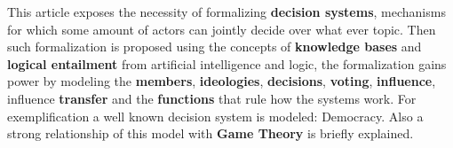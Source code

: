 
This article exposes the necessity of formalizing \textbf{decision systems}, mechanisms for which some amount of actors can jointly decide over what ever topic. Then such formalization is proposed using the concepts of \textbf{knowledge bases} and \textbf{logical entailment} from artificial intelligence and logic, the formalization gains power by modeling the \textbf{members}, \textbf{ideologies}, \textbf{decisions}, \textbf{voting}, \textbf{influence}, influence \textbf{transfer} and the \textbf{functions} that rule how the systems work. For exemplification a well known decision system is modeled: Democracy. Also a strong relationship of this model with \textbf{Game Theory} is briefly explained.